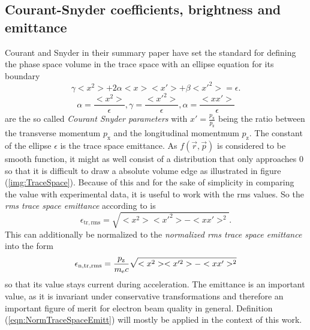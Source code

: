\subsection{Courant-Snyder coefficients, brightness and emittance}
Courant and Snyder in their summary paper \cite{COURANT1958} have set the standard for defining the phase space volume in the trace space with an ellipse equation for its boundary
\begin{equation}
\label{eqn:CourandSnyderEllipse}
\gamma <x^2>+2\alpha <x> <x'>+\beta <x'^2> =\epsilon.
\end{equation}
\begin{equation}
\alpha =\frac{<x^2>}{\epsilon}, \gamma=\frac{<x'^2>}{\epsilon}, \alpha=\frac{<xx'>}{\epsilon}
\end{equation}
are the so called \textit{Courant Snyder parameters} with $x'=\frac{p_\mathrm{x}}{p_\mathrm{z}}$ being the ratio between the transverse momentum $p_\mathrm{x}$ and the longitudinal momentmum $p_\mathrm{z}$.
The constant of the ellipse $\epsilon$ is the trace space emittance. 
As $f(\vec{r},\vec{p})$ is considered to be smooth function, it might as well consist of a distribution that only approaches 0 so that it is difficult to draw a absolute volume edge as illustrated in figure (\ref{img:TraceSpace}).
Because of this and for the sake of simplicity in comparing the value with experimental data, it is useful to work with the rms values. So the \textit{rms trace space emittance} according to \cite{PRSTAB_Emittance_Floettmann} is
\begin{equation}
\epsilon_\mathrm{tr,rms}=\sqrt{<x^2><x'^2>-<xx'>^2}.
\end{equation}
This can additionally be normalized to the \textit{normalized rms trace space emittance} into the form
\begin{equation}
\label{eqn:NormTraceSpaceEmitt}
\epsilon_\mathrm{n,tr,rms}=\frac{p_\mathrm{z}}{m_\mathrm{e} c}\sqrt{<x^2><x'^2>-<xx'>^2}
\end{equation} 
so that its value stays current during acceleration.
The emittance is an important value, as it is invariant under conservative transformations and therefore an important 
figure of merit for electron beam quality in general. 
Definition (\ref{eqn:NormTraceSpaceEmitt}) will mostly be applied in the context of this work.
